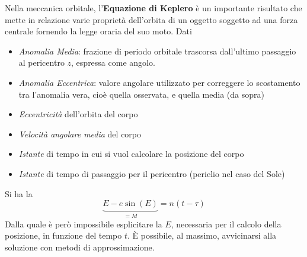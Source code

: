 \begin{example}
	Nella meccanica orbitale, l'\textbf{Equazione di Keplero} è un importante risultato che mette in relazione varie proprietà dell'orbita di un oggetto soggetto ad una forza centrale fornendo la legge oraria del suo moto. Dati
	\begin{itemize}[noitemsep]
		\item {} \textit{Anomalia Media}: frazione di periodo orbitale trascorsa dall'ultimo passaggio al pericentro $z$, espressa come angolo.
		\item {} \textit{Anomalia Eccentrica}: valore angolare utilizzato per correggere lo scostamento tra l'anomalia vera, cioè quella osservata, e quella media (da sopra)
		\item {} \textit{Eccentricità} dell'orbita del corpo
		\item {} \textit{Velocità angolare media} del corpo
		\item {} \textit{Istante} di tempo in cui si vuol calcolare la posizione del corpo
		\item \makebox[2ex]{$\tau$\hfill} \textit{Istante} di tempo di passaggio per il pericentro (perielio nel caso del Sole)
	\end{itemize}
	Si ha la
	\[\underbrace{E - e \sin(E)}_{= M} = n (t - \tau)\]
	Dalla quale è però impossibile esplicitare la $E$, necessaria per il calcolo della posizione, in funzione del tempo $t$. È possibile, al massimo, avvicinarsi alla soluzione con metodi di approssimazione.
\end{example}

